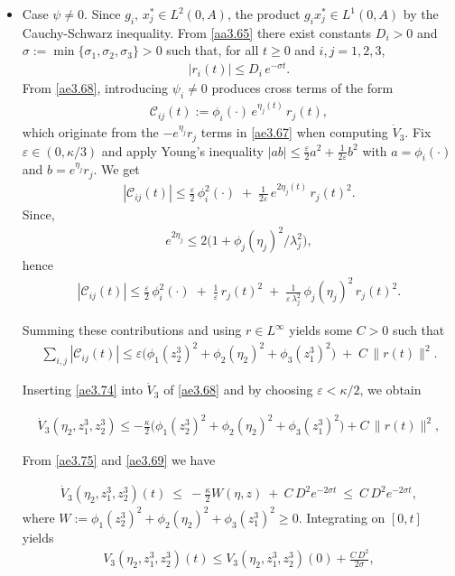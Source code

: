 \documentclass[10pt, a4paper]{amsart}
\makeatletter
\theoremstyle{plain}
\theoremstyle{definition}
\theoremstyle{remark}
\renewenvironment{proof}[1][\proofname]{\par
  \pushQED{\qed}%
  \normalfont \topsep6\p@\@plus6\p@\relax
  \trivlist
  \item[\hskip\labelsep
        \itshape
    #1\ \ref{#1}.]\ignorespaces
}{%
  \popQED\endtrivlist\@endpefalse
}
\numberwithin{equation}{section}
\makeatother
\begin{document}
\begin{proof}[of Lemma \ref{lem3.11}]
\begin{itemize}
\item Case $\psi\neq 0.$ Since $g_i,\,x_j^*\in L^2(0,A)$, the product $g_i x_j^*\in L^1(0,A)$ by the Cauchy-Schwarz inequality. From \eqref{aa3.65} there exist constants $D_i>0$ and
$\sigma:=\min\{\sigma_1,\sigma_2,\sigma_3\}>0$ such that, for all $t\ge0$ and $i,j=1,2,3$,
\begin{align}\label{ae3.69}
|r_i(t)| \le D_i\,e^{-\sigma t}.
\end{align}
From \eqref{ae3.68}, introducing $\psi_i\neq 0$ produces cross terms of the form
\begin{align}
\mathcal{C}_{ij}(t):=\phi_i(\cdot)\,e^{\eta_j(t)}\,r_j(t),
\end{align}
which originate from the $-e^{\eta_j}r_j$ terms in \eqref{ae3.67} when computing $\dot V_3.$ Fix $\varepsilon\in(0,\kappa/3)$ and apply Young's inequality $|ab|\le \tfrac{\varepsilon}{2}a^2+\tfrac{1}{2\varepsilon}b^2$ with $a=\phi_i(\cdot)$ and $b=e^{\eta_j}r_j$. We get
\begin{align}
|\mathcal{C}_{ij}(t)|\le \frac{\varepsilon}{2}\,\phi_i^2(\cdot)\;+\;\frac{1}{2\varepsilon}\,e^{2\eta_j(t)}\,r_j(t)^2.
\end{align}
Since, 
\begin{align}
e^{2\eta_j}\le 2\bigl(1+\phi_j(\eta_j)^2/\lambda_j^2\bigr),
\end{align}
hence
\begin{align}
|\mathcal{C}_{ij}(t)|\le \frac{\varepsilon}{2}\,\phi_i^2(\cdot)\;+\;\frac{1}{\varepsilon}\,r_j(t)^2\;+\;\frac{1}{\varepsilon\,\lambda_j^2}\,\phi_j(\eta_j)^2\,r_j(t)^2.
\end{align}

Summing these contributions and using $r\in L^\infty$  yields some $C>0$ such that
\begin{align}\label{ae3.74}
\sum_{i,j}|\mathcal{C}_{ij}(t)|
\le \varepsilon\Big(\phi_1(z^3_2)^2+\phi_2(\eta_2)^2+\phi_3(z^3_1)^2\Big)\;+\;C\,\|r(t)\|^2.
\end{align}

Inserting \eqref{ae3.74} into  $\dot V_3$ of \eqref{ae3.68} and by choosing $\varepsilon<\kappa/2$, we obtain

\begin{align}\label{ae3.75}
\dot V_3(\eta_2, z^3_1, z^3_2) \le -\frac{\kappa}{2}\Big(\phi_1(z^3_2)^2+\phi_2(\eta_2)^2+\phi_3(z^3_1)^2\Big)
+ C\,\|r(t)\|^2,
\end{align}

From \eqref{ae3.75} and \eqref{ae3.69} we have

\begin{align}
\dot V_3(\eta_2, z^3_1, z^3_2)(t)\ \le\ -\tfrac{\kappa}{2}W(\eta,z)\ +\ C\,D^2 e^{-2\sigma t}
\ \le\ C\,D^2 e^{-2\sigma t},
\end{align}
where $W:=\phi_1(z^3_2)^2+\phi_2(\eta_2)^2+\phi_3(z^3_1)^2\ge0$.
Integrating on $[0,t]$ yields
\begin{align}
V_3(\eta_2, z^3_1, z^3_2)(t)\le V_3(\eta_2, z^3_1, z^3_2)(0)+\frac{C\,D^2}{2\sigma},
\end{align}


\end{itemize}
\end{proof}
\end{document}
